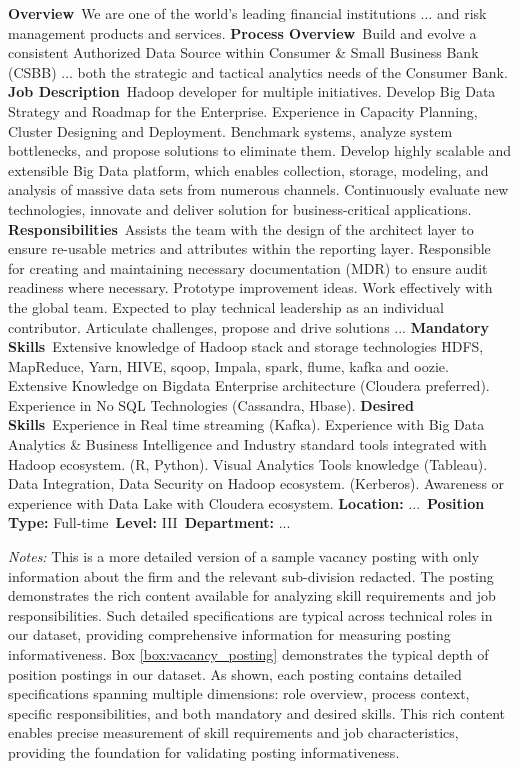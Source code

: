 \clearpage
\begin{tcolorbox}[colback=boxbackground,colframe=boxframe,sharp corners,
title=Sample Job Description,
label=box:vacancy_posting]
\noindent \textbf{Overview}\
We are one of the world's leading financial institutions ... and risk management products and services.
\noindent \textbf{Process Overview}\
Build and evolve a consistent Authorized Data Source within Consumer & Small Business Bank (CSBB) ... both the strategic and tactical analytics needs of the Consumer Bank.
\noindent \textbf{Job Description}\
Hadoop developer for multiple initiatives. Develop Big Data Strategy and Roadmap for the Enterprise. Experience in Capacity Planning, Cluster Designing and Deployment. Benchmark systems, analyze system bottlenecks, and propose solutions to eliminate them. Develop highly scalable and extensible Big Data platform, which enables collection, storage, modeling, and analysis of massive data sets from numerous channels. Continuously evaluate new technologies, innovate and deliver solution for business-critical applications.
\noindent \textbf{Responsibilities}\
Assists the team with the design of the architect layer to ensure re-usable metrics and attributes within the reporting layer. Responsible for creating and maintaining necessary documentation (MDR) to ensure audit readiness where necessary. Prototype improvement ideas. Work effectively with the global team. Expected to play technical leadership as an individual contributor. Articulate challenges, propose and drive solutions ...
\noindent \textbf{Mandatory Skills}\
Extensive knowledge of Hadoop stack and storage technologies HDFS, MapReduce, Yarn, HIVE, sqoop, Impala, spark, flume, kafka and oozie. Extensive Knowledge on Bigdata Enterprise architecture (Cloudera preferred). Experience in No SQL Technologies (Cassandra, Hbase).
\noindent \textbf{Desired Skills}\
Experience in Real time streaming (Kafka). Experience with Big Data Analytics & Business Intelligence and Industry standard tools integrated with Hadoop ecosystem. (R, Python). Visual Analytics Tools knowledge (Tableau). Data Integration, Data Security on Hadoop ecosystem. (Kerberos). Awareness or experience with Data Lake with Cloudera ecosystem.
\noindent \textbf{Location:} ...\
\textbf{Position Type:} Full-time\
\textbf{Level:} III\
\textbf{Department:} ...
\end{tcolorbox}
\noindent \textit{Notes:} This is a more detailed version of a sample vacancy posting with only information about the firm and the relevant sub-division redacted. The posting demonstrates the rich content available for analyzing skill requirements and job responsibilities. Such detailed specifications are typical across technical roles in our dataset, providing comprehensive information for measuring posting informativeness.
Box \ref{box:vacancy_posting} demonstrates the typical depth of position postings in our dataset. As shown, each posting contains detailed specifications spanning multiple 
dimensions: role overview, process context, specific responsibilities, and both mandatory and desired skills. This rich content enables precise measurement of skill 
requirements and job characteristics, providing the foundation for validating posting informativeness.

